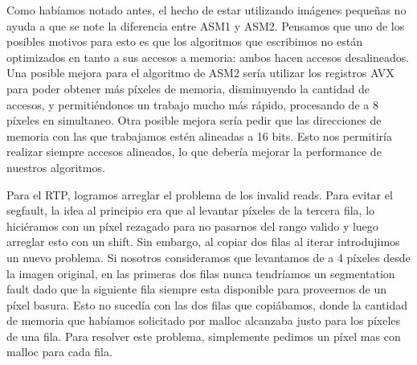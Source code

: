 Como habíamos notado antes, el hecho de estar utilizando imágenes pequeñas no ayuda a que se note la diferencia entre ASM1 y ASM2. Pensamos que uno de los posibles motivos para esto es que los algoritmos que escribimos no están optimizados en tanto a sus accesos a memoria: ambos hacen accesos desalineados. Una posible mejora para el algoritmo de ASM2 sería utilizar los registros AVX para poder obtener más píxeles de memoria, disminuyendo la cantidad de accesos, y permitiéndonos un trabajo mucho más rápido, procesando de a 8 píxeles en simultaneo. Otra posible mejora sería pedir que las direcciones de memoria con las que trabajamos estén alineadas a 16 bits. Esto nos permitiría realizar siempre accesos alineados, lo que debería mejorar la performance de nuestros algoritmos.

Para el RTP, logramos arreglar el problema de los invalid reads. Para evitar el segfault, la idea al principio era que al levantar píxeles de la tercera fila, lo hiciéramos con un píxel rezagado para no pasarnos del rango valido y luego arreglar esto con un shift. Sin embargo, al copiar dos filas al iterar introdujimos un nuevo problema. Si nosotros consideramos que levantamos de a 4 píxeles desde la imagen original, en las primeras dos filas nunca tendríamos un segmentation fault dado que la siguiente fila siempre esta disponible para proveernos de un píxel basura. Esto no sucedía con las dos filas que copiábamos, donde la cantidad de memoria que habíamos solicitado por malloc alcanzaba justo para los píxeles de una fila. Para resolver este problema, simplemente pedimos un píxel mas con malloc para cada fila.
